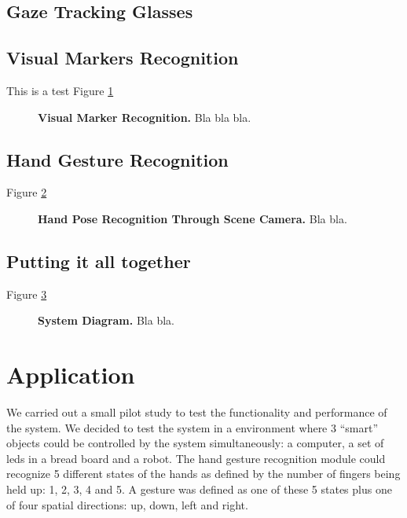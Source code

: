 \documentclass[jou,a4paper,notxfonts]{apa}
\begin{document}
\subsection{Gaze Tracking Glasses}

\subsection{Visual Markers Recognition}

This is a test Figure \ref{visualMarker}

\begin{figure}[tp]
 \caption{\textbf{Visual Marker Recognition.} Bla bla bla.}
 \label{visualMarker}
\end{figure}


\subsection{Hand Gesture Recognition}

Figure \ref{hand}

\begin{figure}[tp]
 \caption{\textbf{Hand Pose Recognition Through Scene Camera.} Bla bla.}
 \label{hand}
\end{figure}

\subsection{Putting it all together}
Figure \ref{systemDiagram}

\begin{figure}[tp]
 \caption{\textbf{System Diagram.} Bla bla.}
 \label{systemDiagram}
\end{figure}


\section{Application}
We carried out a small pilot study to test the functionality and performance of the system. We decided to test the
system in a environment where 3 ``smart'' objects could be controlled by the system simultaneously: a computer, a set of
leds in a bread board and a robot. The hand gesture recognition module could recognize 5 different states of the hands
as defined by the number of fingers being held up: 1, 2, 3, 4 and 5. A gesture was defined as one of these 5 states plus
one of four spatial directions: up, down, left and right.
\end{document}

